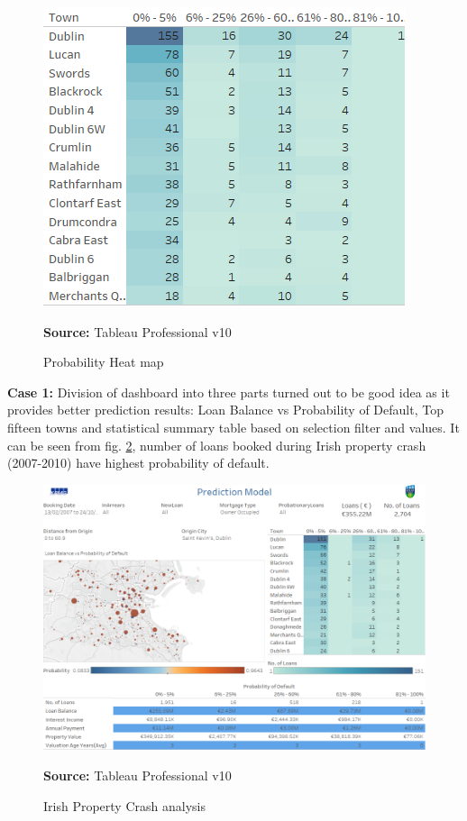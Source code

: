 \begin{center}
\begin{figure}[!htb]
\includegraphics[width=\textwidth]{heatmap.png}
\centering
\caption{Probability Heat map}{\textbf{Source:} Tableau Professional v10}
\label{fig:heatmap}
\end{figure}
\end{center}

\textbf{Case 1:} Division of dashboard into three parts turned out to be good idea as it provides better prediction results: Loan Balance vs Probability of Default, Top fifteen towns and statistical summary table based on selection filter and values. It can be seen from fig. \ref{fig:crash}, number of loans booked during Irish property crash (2007-2010) have highest probability of default.

\begin{center}
\begin{figure}[!htb]
\includegraphics[width=\textwidth]{crash.png}
\centering
\caption{Irish Property Crash analysis}{\textbf{Source:} Tableau Professional v10}
\label{fig:crash}
\end{figure}
\end{center}

